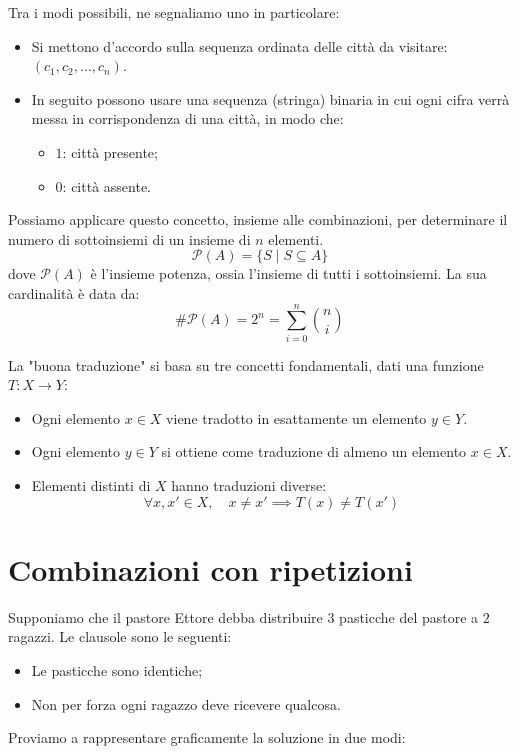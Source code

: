 \documentclass[12pt]{report}
\begin{document}
	Tra i modi possibili, ne segnaliamo uno in particolare:
	\begin{itemize}
		\item Si mettono d'accordo sulla sequenza ordinata delle città da visitare: $(c_1, c_2, \dots, c_n)$.
		\item In seguito possono usare una sequenza (stringa) binaria in cui ogni cifra verrà messa in corrispondenza di una città, in modo che:
		\begin{itemize}
			\item $1$: città presente;
			\item $0$: città assente.
		\end{itemize}
	\end{itemize}
	
	Possiamo applicare questo concetto, insieme alle combinazioni, per determinare il numero di sottoinsiemi di un insieme di $n$ elementi.
	\[
	\mathcal{P}(A) = \{S \mid S \subseteq A\}
	\]
	dove $\mathcal{P}(A)$ è l'insieme potenza, ossia l'insieme di tutti i sottoinsiemi. La sua cardinalità è data da:
	\[
	\#\mathcal{P}(A) = 2^n = \sum_{i=0}^{n} \binom{n}{i}
	\]
	
	La "buona traduzione" si basa su tre concetti fondamentali, dati una funzione $T: X \to Y$:
	\begin{itemize}
		\item Ogni elemento $x \in X$ viene tradotto in esattamente un elemento $y \in Y$.
		\item Ogni elemento $y \in Y$ si ottiene come traduzione di almeno un elemento $x \in X$.
		\item Elementi distinti di $X$ hanno traduzioni diverse:
		\[
		\forall x, x' \in X, \quad x \neq x' \implies T(x) \neq T(x')
		\]
	\end{itemize}
	
	\section{Combinazioni con ripetizioni}
	
	Supponiamo che il pastore Ettore debba distribuire $3$ pasticche del pastore a $2$ ragazzi.
	Le clausole sono le seguenti:
	\begin{itemize}
		\item Le pasticche sono identiche;
		\item Non per forza ogni ragazzo deve ricevere qualcosa.
	\end{itemize}
	
	Proviamo a rappresentare graficamente la soluzione in due modi:
	
\end{document}
